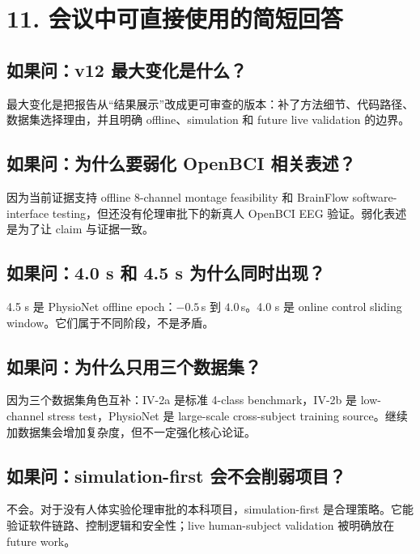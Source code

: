 \documentclass[UTF8,12pt,a4paper]{ctexart}
\begin{document}
\section*{11. 会议中可直接使用的简短回答}

\subsection*{如果问：v12 最大变化是什么？}

最大变化是把报告从“结果展示”改成更可审查的版本：补了方法细节、代码路径、数据集选择理由，并且明确 offline、simulation 和 future live validation 的边界。

\subsection*{如果问：为什么要弱化 OpenBCI 相关表述？}

因为当前证据支持 offline 8-channel montage feasibility 和 BrainFlow software-interface testing，但还没有伦理审批下的新真人 OpenBCI EEG 验证。弱化表述是为了让 claim 与证据一致。

\subsection*{如果问：4.0 s 和 4.5 s 为什么同时出现？}

4.5 s 是 PhysioNet offline epoch：$-0.5$\,s 到 $4.0$\,s。4.0 s 是 online control sliding window。它们属于不同阶段，不是矛盾。

\subsection*{如果问：为什么只用三个数据集？}

因为三个数据集角色互补：IV-2a 是标准 4-class benchmark，IV-2b 是 low-channel stress test，PhysioNet 是 large-scale cross-subject training source。继续加数据集会增加复杂度，但不一定强化核心论证。

\subsection*{如果问：simulation-first 会不会削弱项目？}

不会。对于没有人体实验伦理审批的本科项目，simulation-first 是合理策略。它能验证软件链路、控制逻辑和安全性；live human-subject validation 被明确放在 future work。
\end{document}
